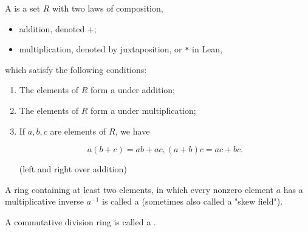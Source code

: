 \begin{definition}[Ring]
    \label{ring}
    \leanok

    A  is a set $R$ with two laws of composition, 
    
    \begin{itemize}
        
    \item addition, denoted $+$;
    \item multiplication, denoted by juxtaposition, or \texttt{*} in Lean,
    
    \end{itemize}
    
    which satisfy the following conditions:

    \begin{enumerate}
    \item The elements of $R$ form a  under addition;

    \item The elements of $R$ form a  under multiplication;

    \item If $a, b, c$ are elements of $R$, we have

    $$
    a (b + c) = a b + a c, (a + b) c = a c + b c.
    $$

    (left and right  over addition)

    \end{enumerate}

\end{definition}

\begin{definition}
    \label{division_ring}
    \leanok

    A ring containing at least two elements, in which
    every nonzero element $a$ has a multiplicative inverse $a^{-1}$ is called a  
    (sometimes also called a "skew field").

\end{definition}

\begin{definition}[Field]
    \label{field}
    \leanok

    A commutative division ring is called a .

\end{definition}

